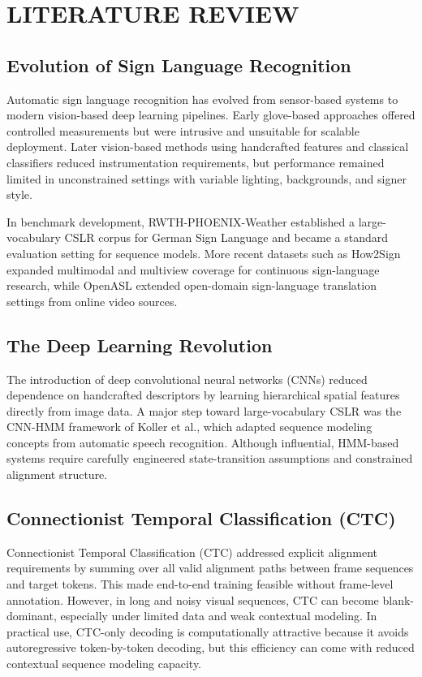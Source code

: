 \chapter{LITERATURE REVIEW}

\section{Evolution of Sign Language Recognition}

Automatic sign language recognition has evolved from sensor-based systems to modern vision-based deep learning pipelines. Early glove-based approaches offered controlled measurements but were intrusive and unsuitable for scalable deployment. Later vision-based methods using handcrafted features and classical classifiers reduced instrumentation requirements, but performance remained limited in unconstrained settings with variable lighting, backgrounds, and signer style.

In benchmark development, RWTH-PHOENIX-Weather established a large-vocabulary CSLR corpus for German Sign Language and became a standard evaluation setting for sequence models.\cite{forster2012rwth} More recent datasets such as How2Sign expanded multimodal and multiview coverage for continuous sign-language research,\cite{duarte2021how2sign} while OpenASL extended open-domain sign-language translation settings from online video sources.\cite{shi2022openasl}

\section{The Deep Learning Revolution}

The introduction of deep convolutional neural networks (CNNs) reduced dependence on handcrafted descriptors by learning hierarchical spatial features directly from image data. A major step toward large-vocabulary CSLR was the CNN-HMM framework of Koller et al.,\cite{koller2015continuous} which adapted sequence modeling concepts from automatic speech recognition. Although influential, HMM-based systems require carefully engineered state-transition assumptions and constrained alignment structure.

\section{Connectionist Temporal Classification (CTC)}

Connectionist Temporal Classification (CTC) \cite{graves2006connectionist} addressed explicit alignment requirements by summing over all valid alignment paths between frame sequences and target tokens. This made end-to-end training feasible without frame-level annotation. However, in long and noisy visual sequences, CTC can become blank-dominant, especially under limited data and weak contextual modeling. In practical use, CTC-only decoding is computationally attractive because it avoids autoregressive token-by-token decoding, but this efficiency can come with reduced contextual sequence modeling capacity.

